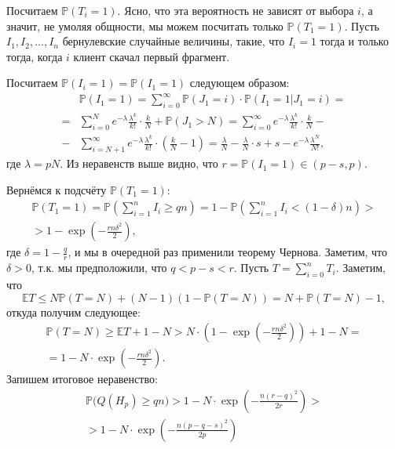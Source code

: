\documentclass[10pt]{article}
\newcommand{\Expect}{\mathbb E}
\newcommand{\PRob}{\mathbb P}
\newcommand{\leqs}{\leqslant}
\newcommand{\geqs}{\geqslant}
\theoremstyle{named}
\begin{document}
Посчитаем $\PRob(T_i = 1)$. Ясно, что эта вероятность не зависят от выбора $i$, а значит, 
не умоляя общности, мы можем посчитать только $\PRob(T_1 = 1)$.
Пусть $I_1, I_2, \dots, I_n$ бернулевские случайные величины, такие, что $I_i = 1$ тогда и только тогда, 
когда $i$ клиент скачал первый фрагмент. 

Посчитаем $\PRob(I_i = 1) = \PRob(I_1 = 1)$ следующем образом:
\begin{equation}\begin{aligned}
&\PRob(I_1 = 1) = \sum_{i = 0}^\infty \PRob(J_1 = i) \cdot \PRob(I_1 = 1 | J_1 = i) 
	= 
\\
	= 
&\sum_{i = 0}^N e^{-\lambda} \frac{\lambda^k}{k!} \cdot \frac {k}{N} + \PRob(J_1 > N)
	=
\sum_{i = 0}^{\infty} e^{-\lambda} \frac{\lambda^k}{k!} \cdot \frac {k}{N}  
	- 
	\\
	-
&\sum_{i = N + 1}^{\infty} e^{-\lambda} \frac{\lambda^k}{k!} \cdot \left(\frac {k}{N} - 1\right)
	=
\frac{\lambda}{N} - \frac{\lambda}{N} \cdot s + s - e^{-\lambda} \frac{\lambda^N}{N!},
\end{aligned}\end{equation}
где $\lambda = pN$. Из неравенств выше видно, что $r = \PRob(I_1 = 1) \in (p - s, p)$.

Вернёмся к подсчёту $\PRob(T_1 = 1)$:
\begin{equation}\begin{aligned}
\PRob(T_1 = 1) = \PRob\left(\sum_{i=1}^n I_i \geqs qn\right) 
	= 
1 - \PRob\left(\sum_{i=1}^n I_i < (1-\delta)n\right)
	>
\\
	>
1 - \exp \left( - \frac{rn \delta^2}{2} \right),
\end{aligned}\end{equation}
где $\delta = 1 - \frac{q}{r}$, и мы в очередной раз применили теорему Чернова. 
Заметим, что $\delta > 0$, т.к. мы предположили, что $q < p-s < r$.
Пусть $T = \sum\limits_{i = 0}^n T_i$. Заметим, что 
\begin{equation}
\Expect T \leqs N \PRob(T = N) + (N-1) (1 - \PRob(T = N)) = N + \PRob(T = N) - 1,
\end{equation}
откуда получим следующее:
\begin{equation}\begin{aligned}
\PRob(T = N) \geqs \Expect T + 1 - N > N \cdot \left(1 - \exp \left( - \frac{rn \delta^2}{2} \right)\right)  + 1 - N
=
	\\
=
1 - N \cdot \exp \left( - \frac{rn \delta^2}{2} \right).
\end{aligned}\end{equation}
Запишем итоговое неравенство:
\begin{equation}\label{t3_1} \begin{aligned}
\PRob\big(Q(H_p) \geqs qn \big) 
	> 
1 - N \cdot \exp\left(- \frac{n (r-q)^2}{2r} \right)
	>
\\ 
	>  
1 - N \cdot \exp\left(- \frac{n (p - q - s)^2}{2p} \right) 
\end{aligned}\end{equation}
\end{document}
